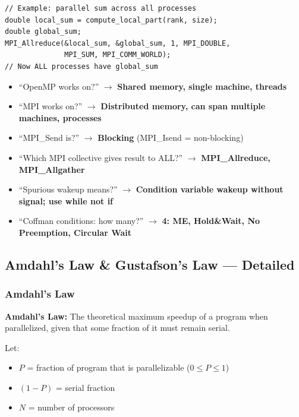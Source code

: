 \documentclass[11pt,a4paper]{article}
\newcommand{\highlight}[1]{\colorbox{yellow!50}{\textbf{#1}}}
\begin{document}
\begin{lstlisting}
// Example: parallel sum across all processes
double local_sum = compute_local_part(rank, size);
double global_sum;
MPI_Allreduce(&local_sum, &global_sum, 1, MPI_DOUBLE,
              MPI_SUM, MPI_COMM_WORLD);
// Now ALL processes have global_sum
\end{lstlisting}

\begin{mcqtrap}
\begin{itemize}[noitemsep]
  \item ``OpenMP works on?'' $\to$ \highlight{Shared memory, single machine, threads}
  \item ``MPI works on?'' $\to$ \highlight{Distributed memory, can span multiple machines, processes}
  \item ``MPI\_Send is?'' $\to$ \highlight{Blocking} (MPI\_Isend = non-blocking)
  \item ``Which MPI collective gives result to ALL?'' $\to$ \highlight{MPI\_Allreduce, MPI\_Allgather}
  \item ``Spurious wakeup means?'' $\to$ \highlight{Condition variable wakeup without signal; use while not if}
  \item ``Coffman conditions: how many?'' $\to$ \highlight{4: ME, Hold\&Wait, No Preemption, Circular Wait}
\end{itemize}
\end{mcqtrap}

\subsection{Amdahl's Law \& Gustafson's Law --- Detailed}

\subsubsection{Amdahl's Law}

\begin{mydef}
\textbf{Amdahl's Law:} The theoretical maximum speedup of a program when parallelized, given that some fraction of it must remain serial.
\end{mydef}

Let:
\begin{itemize}[noitemsep]
  \item $P$ = fraction of program that is parallelizable ($0 \leq P \leq 1$)
  \item $(1-P)$ = serial fraction
  \item $N$ = number of processors
\end{itemize}
\end{document}
